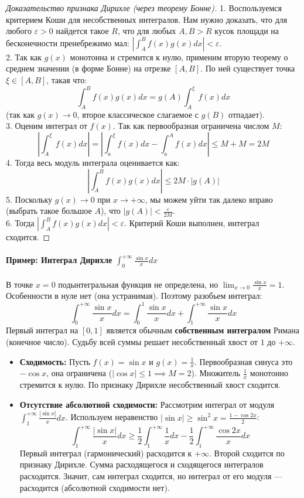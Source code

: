 \begin{proof}[Доказательство признака Дирихле (через теорему Бонне)]
1. Воспользуемся критерием Коши для несобственных интегралов. Нам нужно доказать, что для любого $\varepsilon > 0$ найдется такое $R$, что для любых $A, B > R$ кусок площади на бесконечности пренебрежимо мал: $\left| \int_A^B f(x)g(x) dx \right| < \varepsilon$. \\
2. Так как $g(x)$ монотонна и стремится к нулю, применим вторую теорему о среднем значении (в форме Бонне) на отрезке $[A, B]$. По ней существует точка $\xi \in [A, B]$, такая что:
$$\int_A^B f(x)g(x) dx = g(A) \int_A^\xi f(x) dx$$
(так как $g(x) \to 0$, второе классическое слагаемое с $g(B)$ отпадает). \\
3. Оценим интеграл от $f(x)$. Так как первообразная ограничена числом $M$:
$$\left| \int_A^\xi f(x) dx \right| = \left| \int_a^\xi f(x) dx - \int_a^A f(x) dx \right| \le M + M = 2M$$
4. Тогда весь модуль интеграла оценивается как:
$$\left| \int_A^B f(x)g(x) dx \right| \le 2M \cdot |g(A)|$$
5. Поскольку $g(x) \to 0$ при $x \to +\infty$, мы можем уйти так далеко вправо (выбрать такое большое $A$), что $|g(A)| < \frac{\varepsilon}{2M}$. \\
6. Тогда $\left| \int_A^B f(x)g(x) dx \right| < \varepsilon$. Критерий Коши выполнен, интеграл сходится.
\end{proof}

\paragraph{Пример: Интеграл Дирихле $\int_0^{+\infty} \frac{\sin x}{x} dx$}
В точке $x=0$ подынтегральная функция не определена, но $\lim_{x \to 0} \frac{\sin x}{x} = 1$. Особенности в нуле нет (она устранимая). Поэтому разобьем интеграл:
$$\int_0^{+\infty} \frac{\sin x}{x} dx = \int_0^1 \frac{\sin x}{x} dx + \int_1^{+\infty} \frac{\sin x}{x} dx$$
Первый интеграл на $[0, 1]$ является обычным \textbf{собственным интегралом} Римана (конечное число). Судьбу всей суммы решает несобственный хвост от $1$ до $+\infty$.
\begin{itemize}
    \item \textbf{Сходимость:} Пусть $f(x) = \sin x$ и $g(x) = \frac{1}{x}$. Первообразная синуса это $-\cos x$, она ограничена ($|\cos x| \le 1 \implies M=2$). Множитель $\frac{1}{x}$ монотонно стремится к нулю. По признаку Дирихле несобственный хвост сходится.
    \item \textbf{Отсутствие абсолютной сходимости:} Рассмотрим интеграл от модуля $\int_1^{+\infty} \frac{|\sin x|}{x} dx$. 
    Используем неравенство $|\sin x| \ge \sin^2 x = \frac{1 - \cos 2x}{2}$:
    $$\int_1^{+\infty} \frac{|\sin x|}{x} dx \ge \frac{1}{2} \int_1^{+\infty} \frac{1}{x} dx - \frac{1}{2} \int_1^{+\infty} \frac{\cos 2x}{x} dx$$
    Первый интеграл (гармонический) расходится к $+\infty$. Второй сходится по признаку Дирихле. Сумма расходящегося и сходящегося интегралов расходится. Значит, сам интеграл сходится, но интеграл от его модуля — расходится (абсолютной сходимости нет).
\end{itemize}

